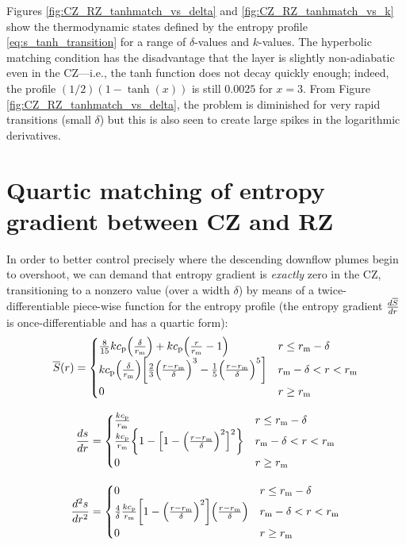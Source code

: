 \documentclass[12pt]{article} %
\newcommand{\rrm}{r_{\rm{m}}}
\begin{document}
Figures \ref{fig:CZ_RZ_tanhmatch_vs_delta} and \ref{fig:CZ_RZ_tanhmatch_vs_k} show the thermodynamic states defined by the entropy profile \eqref{eq:s_tanh_transition} for a range of $\delta$-values and $k$-values. The hyperbolic matching condition has the disadvantage that the layer is slightly non-adiabatic even in the CZ---i.e., the tanh function does not decay quickly enough; indeed, the profile $(1/2)(1-\tanh(x))$ is still $0.0025$ for $x=3$. From Figure \ref{fig:CZ_RZ_tanhmatch_vs_delta}, the problem is diminished for very rapid transitions (small $\delta$) but this is also seen to create large spikes in the logarithmic derivatives. 

\section{Quartic matching of entropy gradient between CZ and RZ}
 In order to better control precisely where the descending downflow plumes begin to overshoot, we can demand that entropy gradient is \textit{exactly} zero in the CZ, transitioning to a nonzero value (over a width $\delta$) by means of a twice-differentiable piece-wise function for the entropy profile (the entropy gradient $\frac{d\overline{S}}{dr}$ is once-differentiable and has a quartic form):
\begin{equation}\label{eq:s_quart_transition}
\sref\ofr = \begin{cases}
\frac{8}{15}k\cp\Big{(}\frac{\delta}{\rrm}\Big{)} + k\cp\Big{(}\frac{r}{\rrm} - 1\Big{)} &r\leq \rrm - \delta\\
k\cp\Big{(}\frac{\delta}{\rrm}\Big{)}\bigg{[}\frac{2}{3}\Big{(}\frac{r-\rrm}{\delta}\Big{)}^3 - \frac{1}{5} \Big{(}\frac{r-\rrm}{\delta}\Big{)}^5\bigg{]} & \rrm - \delta < r < \rrm\\
0 & r\geq \rrm
\end{cases}
\end{equation}

\begin{equation}\label{eq:dsdr_quart_transition}
\frac{ds}{dr} = \begin{cases}
\frac{k\cp}{\rrm} & r\leq \rrm - \delta\\
\frac{k\cp}{\rrm}\bigg{\{}1 - \Big{[}1 - \Big{(}\frac{r-\rrm}{\delta}\Big{)}^2\Big{]}^2\bigg{\}} & \rrm - \delta < r < \rrm\\
0 & r\geq \rrm
\end{cases}
\end{equation}

\begin{equation}\label{eq:d2sdr2_quart_transition}
\frac{d^2s}{dr^2} = \begin{cases}
0 & r\leq \rrm - \delta\\
\frac{4}{\delta}\frac{k\cp}{\rrm}\bigg{[}1 - \Big{(}\frac{r-\rrm}{\delta}\Big{)}^2\bigg{]}\Big{(}\frac{r-\rrm}{\delta}\Big{)} & \rrm - \delta < r < \rrm\\
0 & r\geq \rrm
\end{cases}
\end{equation}
\end{document}
